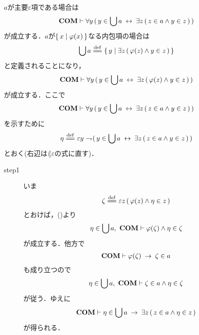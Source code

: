 	\begin{sketch}
		$a$が主要$\varepsilon$項である場合は
		\begin{align}
			\mbox{\bf COM} \vdash \forall y\, (\, y \in \bigcup a \hspace{0.25em}\leftrightarrow\hspace{0.25em} 
				\exists z\, (\, z \in a \wedge y \in z\, )\, )
		\end{align}
		が成立する．$a$が$\left\{\, x \mid \varphi(x)\, \right\}$なる内包項の場合は
		\begin{align}
			\bigcup a \defeq \Set{y}{\exists z\, (\, \varphi(z) \wedge y \in z\, )}
		\end{align}
		と定義されることになり，
		\begin{align}
			\mbox{\bf COM} \vdash \forall y\, (\, y \in \bigcup a \hspace{0.25em}\leftrightarrow\hspace{0.25em} 
				\exists z\, (\, \varphi(z) \wedge y \in z\, )\, )
			\label{fom:comprehension_of_unions_1}
		\end{align}
		が成立する．ここで
		\begin{align}
			\mbox{\bf COM} \vdash \forall y\, (\, y \in \bigcup a \hspace{0.25em}\leftrightarrow\hspace{0.25em} 
				\exists z\, (\, z \in a \wedge y \in z\, )\, )
		\end{align}
		を示すために
		\begin{align}
			\eta \defeq \varepsilon y \negation (\, y \in \bigcup a \lrarrow 
				\exists z\, (\, z \in a \wedge y \in z\, )\, )
		\end{align}
		とおく(右辺は$\lang{\varepsilon}$の式に直す)．
		\begin{description}
			\item[step1]
				いま
				\begin{align}
					\zeta \defeq \varepsilon z\, (\, \varphi(z) \wedge \eta \in z\, )
				\end{align}
				とおけば，()より
				\begin{align}
					\eta \in \bigcup a,\ \mbox{\bf COM} \vdash
					\varphi(\zeta) \wedge \eta \in \zeta
				\end{align}
				が成立する．他方で
				\begin{align}
					\mbox{\bf COM} \vdash \varphi(\zeta) \hspace{0.25em}\rightarrow\hspace{0.25em} \zeta \in a
				\end{align}
				も成り立つので
				\begin{align}
					\eta \in \bigcup a,\ \mbox{\bf COM} \vdash
					\zeta \in a \wedge \eta \in \zeta
				\end{align}
				が従う．ゆえに
				\begin{align}
					\mbox{\bf COM} \vdash \eta \in \bigcup a \hspace{0.25em}\rightarrow\hspace{0.25em}
					\exists z\, (\, z \in a \wedge \eta \in z\, )
					\label{fom:comprehension_of_unions_2}
				\end{align}
				が得られる．
				

\end{description}
\end{sketch}
